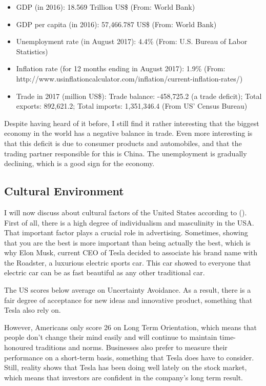 \documentclass[12pt]{article}
\begin{document}
\begin{itemize}
	\item{GDP (in 2016): 18.569 Trillion US\$ (From: World Bank)}
	\item{GDP per capita (in 2016): 57,466.787 US\$ (From: World Bank)}
	\item{Unemployment rate (in August 2017): 4.4\% (From: U.S. Bureau of Labor Statistics)}
	\item{Inflation rate (for 12 months ending in August 2017): 1.9\% (From: http://www.usinflationcalculator.com/inflation/current-inflation-rates/)}
	\item{Trade in 2017 (million US\$): Trade balance: -458,725.2 (a trade deficit); Total exports: 892,621.2; Total imports: 1,351,346.4 (From US' Census Bureau)}
\end{itemize}

Despite having heard of it before, I still find it rather interesting that the biggest economy in the world has a negative balance in trade. Even more interesting is that this deficit is due to consumer products and automobiles, and that the trading partner responsible for this is China. The unemployment is gradually declining, which is a good sign for the economy.

\subsection{Cultural Environment}

I will now discuss about cultural factors of the United States according to (\cite{hoUS}). First of all, there is a high degree of individualism and masculinity in the USA. That important factor plays a crucial role in advertising. Sometimes, showing that you are the best is more important than being actually the best, which is why Elon Musk, current CEO of Tesla decided to associate his brand name with the Roadster, a luxurious electric sports car. This car showed to everyone that electric car can be as fast beautiful as any other traditional car.

The US scores below average on Uncertainty Avoidance. As a result, there is a fair degree of acceptance for new ideas and innovative product, something that Tesla also rely on.

However, Americans only score 26 on Long Term Orientation, which means that people don't change their mind easily and will continue to maintain time-honoured traditions and norms. Businesses also prefer to measure their performance on a short-term basis, something that Tesla does have to consider. Still, reality shows that Tesla has been doing well lately on the stock market, which means that investors are confident in the company's long term result.
\end{document}
